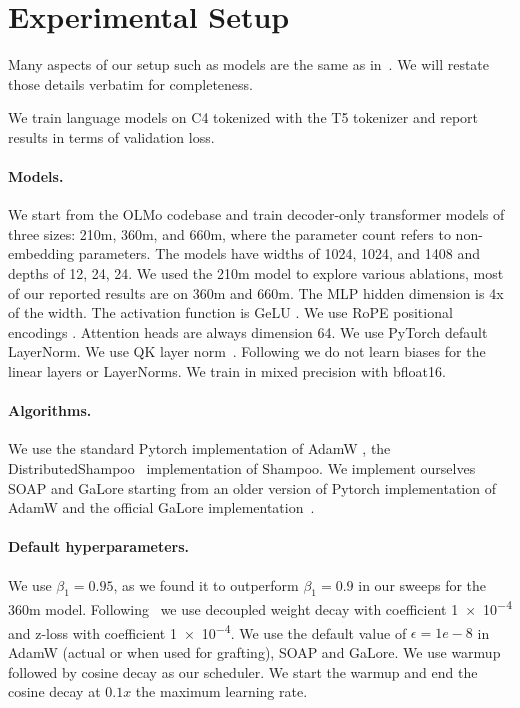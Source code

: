 \documentclass{article}
\def\eps{{\epsilon}}
\begin{document}



\appendix

\section{Experimental Setup}
\label{app:setup}

Many aspects of our setup such as models are the same as in~\citet{zhaoscience}. We will restate those details verbatim for completeness.

We train language models on C4 tokenized with the T5 tokenizer \citep{raffel2020exploring} and report results in terms of validation loss.

\paragraph{Models.} We start from the OLMo codebase \citep{groeneveld2024olmo} and train decoder-only transformer models of three sizes: 210m, 360m, and 660m, where the parameter count refers to non-embedding parameters. The models have widths of 1024, 1024, and 1408 and depths of 12, 24, 24. We used the 210m model to explore various ablations, most of our reported results are on 360m and 660m. The MLP hidden dimension is 4x of the width. The activation function is GeLU \citep{hendrycks2016gaussian}. We use RoPE positional encodings \citep{su2024roformer}. Attention heads are always dimension 64. We use PyTorch default LayerNorm. We use QK layer norm~\citep{dehghani2023scaling}. Following \citet{wortsman2024smallscale} we do not learn biases for the linear layers or LayerNorms. We train in mixed precision with bfloat16.

\paragraph{Algorithms.} We use the standard Pytorch implementation of AdamW \citep{paszke2019pytorch}, the DistributedShampoo~\cite{distributedshampoo}  implementation of Shampoo. We implement ourselves SOAP and GaLore starting from an older version of Pytorch implementation of AdamW and the official GaLore implementation~\cite{galoregithub}.

\paragraph{Default hyperparameters.} We use $\beta_1 = 0.95$, as we found it to outperform $\beta_1 = 0.9$ in our sweeps for the 360m model. Following~\citet{wortsman2024smallscale} we use decoupled weight decay with coefficient \num{1e-4} and z-loss with coefficient \num{1e-4}. We use the default value of $\eps = 1e-8$ in AdamW (actual or when used for grafting), SOAP and GaLore. We use warmup followed by cosine decay as our scheduler.  We start the warmup and end the cosine decay at $0.1x$ the maximum learning rate.
\end{document}
